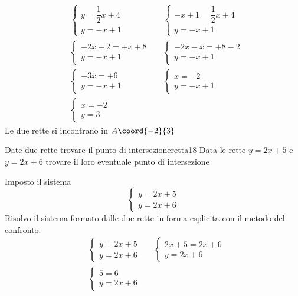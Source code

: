 \begin{align*}
&\begin{cases} 
y=\dfrac{1}{2}x+4\\
y=-x+1
\end{cases}&&\begin{cases} 
-x+1=\dfrac{1}{2}x+4\\
y=-x+1
\end{cases}\\
&\begin{cases} 
-2x+2=+x+8\\
y=-x+1
\end{cases}&&\begin{cases} 
-2x-x=+8-2\\
y=-x+1
\end{cases}\\
&\begin{cases} 
-3x=+6\\
y=-x+1
\end{cases}&&
\begin{cases} 
x=-2\\
y=-x+1
\end{cases}\\
&\begin{cases} 
x=-2\\
y=3
\end{cases}
\end{align*}
Le due rette si incontrano in $A\coord{-2}{3}$
\begin{cesempiot}{Date due rette trovare il punto di intersezione}{retta18}
	Data le rette $y=2x+5$ e $y=2x+6$ trovare il loro eventuale punto di intersezione
\end{cesempiot}
Imposto il sistema 
\[\begin{cases} 
y=2x+5\\
y=2x+6
\end{cases}\]
Risolvo il sistema formato dalle due rette in forma esplicita con il metodo del confronto.
\begin{align*}
&\begin{cases} 
y=2x+5\\
y=2x+6
\end{cases}&&\begin{cases} 
2x+5=2x+6\\
y=2x+6
\end{cases}\\
&\begin{cases} 
5=6\\
y=2x+6
\end{cases}
\end{align*}

